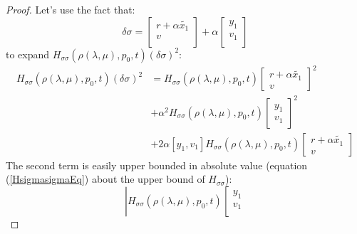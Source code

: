 \documentclass[a4paper,10pt]{article}
\begin{document}
\begin{proof}
    Let's use the fact that:
    \[
        \delta \sigma =
	\left[
        \begin{array}
        {c}
            r+\alpha\tilde{x_{1}}  \\
            v  \\
        \end{array}
        \right]
	+\alpha
	\left[
        \begin{array}
        {c}
            y_{1}  \\
            v_{1}  \\
        \end{array}
        \right]
    \]
    to expand $H_{\sigma \sigma}(\rho(\lambda,\mu),p_{0},t)(\delta \sigma)^{2}$:
    \begin{equation}
       \label{expJ4}
	   \begin{split}
        H_{\sigma 
        \sigma}(\rho(\lambda,\mu),p_{0},t)(\delta \sigma)^{2} & = 
	H_{\sigma \sigma}(\rho(\lambda,\mu),p_{0},t)
	\left[
        \begin{array}
        {c}
            r+\alpha\tilde{x_{1}}  \\
            v  
        \end{array}
        \right]^{2}\\ &
	+\alpha^{2}
	H_{\sigma \sigma}(\rho(\lambda,\mu),p_{0},t)
		\left[
        \begin{array}
        {c}
            y_{1}  \\
            v_{1}  
        \end{array}
        \right]^{2}
        \\
           & + 2 \alpha [y_{1},v_{1}]
	H_{\sigma \sigma}(\rho(\lambda,\mu),p_{0},t)
        \left[
        \begin{array}
        {c}
            r+\alpha\tilde{x_{1}}  \\
            v 
        \end{array}
        \right] 
		\end{split}
     \end{equation}
    The second term is easily upper bounded in absolute value 
    (equation (\ref{HsigmasigmaEq}) about the upper bound of 
    $H_{\sigma\sigma}$):
    \[
        \left|H_{\sigma \sigma}(\rho(\lambda,\mu),p_{0},t)
		\left[
        \begin{array}
        {c}
            y_{1}  \\
            v_{1}  \\
        \end{array}
\]
\end{proof}
\end{document}
